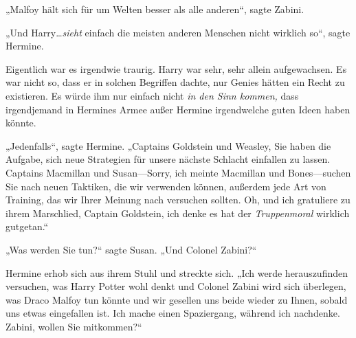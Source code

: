 „Malfoy hält sich für um Welten besser als alle anderen“, sagte Zabini.

„Und Harry…\emph{sieht} einfach die meisten anderen Menschen nicht wirklich so“, sagte Hermine.

Eigentlich war es irgendwie traurig. Harry war sehr, sehr allein aufgewachsen. Es war nicht so, dass er in solchen Begriffen dachte, nur Genies hätten ein Recht zu existieren. Es würde ihm nur einfach nicht \emph{in den Sinn kommen,} dass irgendjemand in Hermines Armee außer Hermine irgendwelche guten Ideen haben könnte.

„Jedenfalls“, sagte Hermine.
„Captains Goldstein und Weasley, Sie haben die Aufgabe, sich neue Strategien für unsere nächste Schlacht einfallen zu lassen. Captains Macmillan und Susan—Sorry, ich meinte Macmillan und Bones—suchen Sie nach neuen Taktiken, die wir verwenden können, außerdem jede Art von Training, das wir Ihrer Meinung nach versuchen sollten. Oh, und ich gratuliere zu ihrem Marschlied, Captain Goldstein, ich denke es hat der \emph{Truppenmoral} wirklich gutgetan.“

„Was werden Sie tun?“ sagte Susan.
„Und Colonel Zabini?“

Hermine erhob sich aus ihrem Stuhl und streckte sich.
„Ich werde herauszufinden versuchen, was Harry Potter wohl denkt und Colonel Zabini wird sich überlegen, was Draco Malfoy tun könnte und wir gesellen uns beide wieder zu Ihnen, sobald uns etwas eingefallen ist. Ich mache einen Spaziergang, während ich nachdenke. Zabini, wollen Sie mitkommen?“

